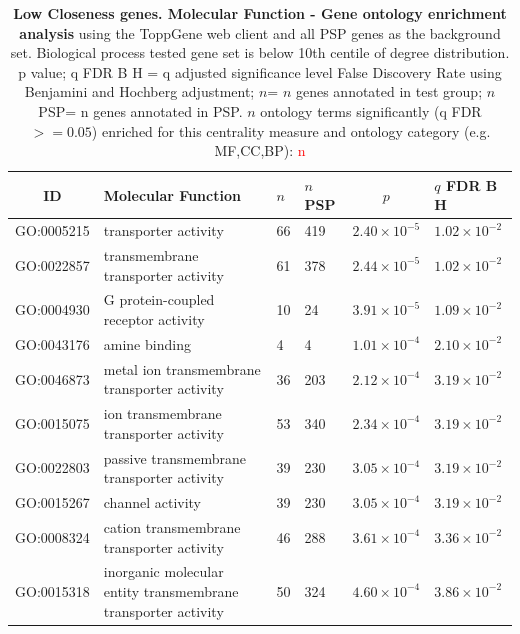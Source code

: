   \begin{table}[ht]
\centering
\begin{adjustbox}{width=\textwidth}
\setlength{\extrarowheight}{2pt}
\begin{tabular}{@{}clllcl@{}}
  \toprule
  ID & Molecular Function & $n$ & $n$ PSP & $p$ & $q$ FDR B H \\ 

  \midrule
GO:0005215 & transporter activity & 66 & 419 & $2.40 \times 10^{-5}$ & $1.02 \times 10^{-2}$ \\ 
  GO:0022857 & transmembrane transporter activity & 61 & 378 & $2.44 \times 10^{-5}$ & $1.02 \times 10^{-2}$ \\ 
  GO:0004930 & G protein-coupled receptor activity & 10 & 24 & $3.91 \times 10^{-5}$ & $1.09 \times 10^{-2}$ \\ 
  GO:0043176 & amine binding & 4 & 4 & $1.01 \times 10^{-4}$ & $2.10 \times 10^{-2}$ \\ 
  GO:0046873 & metal ion transmembrane transporter activity & 36 & 203 & $2.12 \times 10^{-4}$ & $3.19 \times 10^{-2}$ \\ 
  GO:0015075 & ion transmembrane transporter activity & 53 & 340 & $2.34 \times 10^{-4}$ & $3.19 \times 10^{-2}$ \\ 
  GO:0022803 & passive transmembrane transporter activity & 39 & 230 & $3.05 \times 10^{-4}$ & $3.19 \times 10^{-2}$ \\ 
  GO:0015267 & channel activity & 39 & 230 & $3.05 \times 10^{-4}$ & $3.19 \times 10^{-2}$ \\ 
  GO:0008324 & cation transmembrane transporter activity & 46 & 288 & $3.61 \times 10^{-4}$ & $3.36 \times 10^{-2}$ \\ 
  GO:0015318 & inorganic molecular entity transmembrane transporter activity & 50 & 324 & $4.60 \times 10^{-4}$ & $3.86 \times 10^{-2}$ \\ 
   \bottomrule
\end{tabular}
\end{adjustbox}
\caption[Gene ontology enrichment Low Closeness genes Molecular Function of genes above 90th centile of distribution]{\textbf{Low Closeness genes. Molecular Function - Gene ontology enrichment analysis} using the ToppGene web client and all PSP genes as the background set.  Biological process tested gene set is below 10th centile of degree distribution.  p value; q FDR B H = q adjusted significance level False Discovery Rate using Benjamini and Hochberg adjustment; $n$= $n$ genes annotated in test group; $n$ PSP= n genes annotated in PSP. $n$ ontology terms significantly (q FDR$>=0.05$) enriched for this centrality measure and ontology category (e.g. MF,CC,BP): \textcolor{red}{n}} 
 
\label{tab:ToppGENE GO: Molecular Function. clo 10 centile cwpsp.txtp = p value; q FDR B H = q adjusted significance level False Discovery Rate using Benjamini and Hochberg adjustment; n= n genes annotated in test group; n PSP= n genes annotated in PSP}
\end{table}



